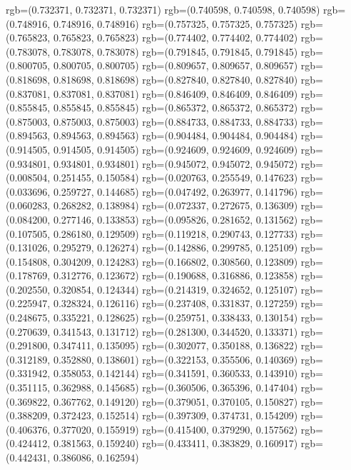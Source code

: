 {{{					rgb=(0.732371, 0.732371, 0.732371)
					rgb=(0.740598, 0.740598, 0.740598)
					rgb=(0.748916, 0.748916, 0.748916)
					rgb=(0.757325, 0.757325, 0.757325)
					rgb=(0.765823, 0.765823, 0.765823)
					rgb=(0.774402, 0.774402, 0.774402)
					rgb=(0.783078, 0.783078, 0.783078)
					rgb=(0.791845, 0.791845, 0.791845)
					rgb=(0.800705, 0.800705, 0.800705)
					rgb=(0.809657, 0.809657, 0.809657)
					rgb=(0.818698, 0.818698, 0.818698)
					rgb=(0.827840, 0.827840, 0.827840)
					rgb=(0.837081, 0.837081, 0.837081)
					rgb=(0.846409, 0.846409, 0.846409)
					rgb=(0.855845, 0.855845, 0.855845)
					rgb=(0.865372, 0.865372, 0.865372)
					rgb=(0.875003, 0.875003, 0.875003)
					rgb=(0.884733, 0.884733, 0.884733)
					rgb=(0.894563, 0.894563, 0.894563)
					rgb=(0.904484, 0.904484, 0.904484)
					rgb=(0.914505, 0.914505, 0.914505)
					rgb=(0.924609, 0.924609, 0.924609)
					rgb=(0.934801, 0.934801, 0.934801)
					rgb=(0.945072, 0.945072, 0.945072)
					rgb=(0.008504, 0.251455, 0.150584)
					rgb=(0.020763, 0.255549, 0.147623)
					rgb=(0.033696, 0.259727, 0.144685)
					rgb=(0.047492, 0.263977, 0.141796)
					rgb=(0.060283, 0.268282, 0.138984)
					rgb=(0.072337, 0.272675, 0.136309)
					rgb=(0.084200, 0.277146, 0.133853)
					rgb=(0.095826, 0.281652, 0.131562)
					rgb=(0.107505, 0.286180, 0.129509)
					rgb=(0.119218, 0.290743, 0.127733)
					rgb=(0.131026, 0.295279, 0.126274)
					rgb=(0.142886, 0.299785, 0.125109)
					rgb=(0.154808, 0.304209, 0.124283)
					rgb=(0.166802, 0.308560, 0.123809)
					rgb=(0.178769, 0.312776, 0.123672)
					rgb=(0.190688, 0.316886, 0.123858)
					rgb=(0.202550, 0.320854, 0.124344)
					rgb=(0.214319, 0.324652, 0.125107)
					rgb=(0.225947, 0.328324, 0.126116)
					rgb=(0.237408, 0.331837, 0.127259)
					rgb=(0.248675, 0.335221, 0.128625)
					rgb=(0.259751, 0.338433, 0.130154)
					rgb=(0.270639, 0.341543, 0.131712)
					rgb=(0.281300, 0.344520, 0.133371)
					rgb=(0.291800, 0.347411, 0.135095)
					rgb=(0.302077, 0.350188, 0.136822)
					rgb=(0.312189, 0.352880, 0.138601)
					rgb=(0.322153, 0.355506, 0.140369)
					rgb=(0.331942, 0.358053, 0.142144)
					rgb=(0.341591, 0.360533, 0.143910)
					rgb=(0.351115, 0.362988, 0.145685)
					rgb=(0.360506, 0.365396, 0.147404)
					rgb=(0.369822, 0.367762, 0.149120)
					rgb=(0.379051, 0.370105, 0.150827)
					rgb=(0.388209, 0.372423, 0.152514)
					rgb=(0.397309, 0.374731, 0.154209)
					rgb=(0.406376, 0.377020, 0.155919)
					rgb=(0.415400, 0.379290, 0.157562)
					rgb=(0.424412, 0.381563, 0.159240)
					rgb=(0.433411, 0.383829, 0.160917)
					rgb=(0.442431, 0.386086, 0.162594)
}}}
